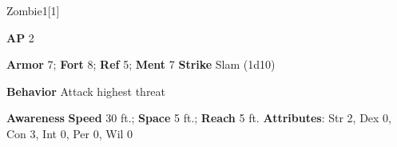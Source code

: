 \begin{monsection}{Zombie}{1}[1]
\vspace{-1em}\vspace{-1em}
\begin{spellcontent}
\begin{spelltargetinginfo}
{\textbf{AP} 2}

\pari \textbf{Armor} 7;
\textbf{Fort} 8;
\textbf{Ref} 5;
\textbf{Ment} 7
\pari \textbf{Strike} Slam  (1d10)



\pari \textbf{Behavior} Attack highest threat
\end{spelltargetinginfo}
\end{spellcontent}

\begin{monsterfooter}
\pari \textbf{Awareness} 
\pari \textbf{Speed} 30 ft.;
\textbf{Space} 5 ft.;
\textbf{Reach} 5 ft.
\pari \textbf{Attributes}:
Str 2,
Dex 0,
Con 3,
Int 0,
Per 0,
Wil 0
\end{monsterfooter}
\end{monsection}
